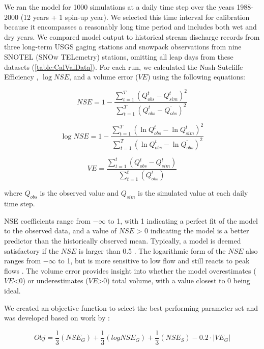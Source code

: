 \documentclass[water,article,submit,moreauthors,pdftex,10pt,a4paper]{mdpi}
\theoremstyle{mdpi}
\newcounter{thm}
\newcounter{re}
\theoremstyle{mdpidefinition}
\begin{document}
We ran the model for 1000 simulations at a daily time step over the years 1988-2000 (12 years + 1 spin-up year). We selected this time interval for calibration because it encompasses a reasonably long time period and includes both wet and dry years. We compared model output to historical stream discharge records from three long-term USGS gaging stations and snowpack observations from nine SNOTEL (SNOw TELemetry) stations, omitting all leap days from these datasets (\cref{table:CalValData}). For each run, we calculated the Nash-Sutcliffe Efficiency \citep[$NSE$,][]{Nash:1970vw}, $\log NSE$, and a volume error ($VE$) using the following equations:

\begin{equation}
NSE = 1 - \frac{\sum_{t=1}^{T} \left(Q_{obs}^t - Q_{sim}^t\right)^2}{\sum_{t=1}^{T} \left(Q_{obs}^t - \overline{Q_{obs}}\right)^2}
\end{equation}

\begin{equation}
\log NSE = 1 - \frac{\sum_{t=1}^{T} \left(\ln{Q_{obs}^t} - \ln{Q_{sim}^t}\right)^2}{\sum_{t=1}^{T} \left(\ln{Q_{obs}^t} - \ln{\overline{Q_{obs}}}\right)^2}
\end{equation}

\begin{equation}
VE = \frac{\sum_{t=1}^{t} \left(Q_{obs}^t - Q_{sim}^t\right)}{\sum_{t=1}^{t} \left(Q_{obs}^t\right)}
\end{equation}

where $Q_{obs}$ is the observed value and $Q_{sim}$ is the simulated value at each daily time step.

NSE coefficients range from $-\infty$ to 1, with 1 indicating a perfect fit of the model to the observed data, and a value of $NSE$ > 0 indicating the model is a better predictor than the historically observed mean. Typically, a model is deemed satisfactory if the $NSE$ is larger than 0.5 \citep{NMoriasi:2007tj}. The logarithmic form of the $NSE$ also ranges from $-\infty$ to 1, but is more sensitive to low flow and still reacts to peak flows \citep{krause:hal-00296842}. The volume error provides insight into whether the model overestimates ($VE$<0) or underestimates ($VE$>0) total volume, with a value closest to 0 being ideal.

We created an objective function to select the best-performing parameter set and was developed based on work by \citep{Inouye:2014ws}:

\begin{equation}
Obj = \frac{1}{3}\left(NSE_G\right) + \frac{1}{3}\left(logNSE_G\right) + \frac{1}{3}\left(NSE_S\right) - 0.2\cdot\left|VE_G\right|
\end{equation}
\end{document}

